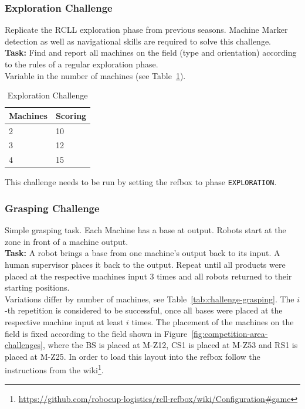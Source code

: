 \documentclass[12pt,twoside]{article}
\newcommand{\reffig}[1]{Figure~\ref{#1}}
\newcommand{\reftab}[1]{Table~\ref{#1}}
\begin{document}
\subsubsection{Exploration Challenge}\label{sec:challenge-exploration}
Replicate the \ac{RCLL} exploration phase from previous seasons.
Machine Marker detection as well as navigational skills are required to solve
this challenge.\\
\textbf{Task:} Find and report all machines on the field (type and orientation)
according to the rules of a regular exploration phase.
\\
Variable in the number of machines
(see \reftab{tab:challenge-exploration}).
\begin{table}[!htb]
 \centering
 \begin{tabular}{l|l}
  Machines & Scoring \\\hline
  2   & 10 \\
  3   & 12 \\
  4   & 15 \\
 \end{tabular}
 \caption{Exploration Challenge}
 \label{tab:challenge-exploration}
\end{table}
This challenge needs to be run by setting the \ac{refbox} to phase
\texttt{EXPLORATION}.

\subsubsection{Grasping Challenge}\label{sec:challenge-grasping}
Simple grasping task.
Each Machine has a base at output.
Robots start at the zone in front of a machine output.\\
\textbf{Task:} A robot brings a base from one machine's output back to its
input. A human supervisor places it back to the output. Repeat until all
products were placed at the respective machines input 3 times and all robots
returned to their starting positions. \\
Variations differ by number of machines, see
\reftab{tab:challenge-grasping}. The $i$-th repetition is considered to be
successful, once all bases were placed at the respective machine input
at least $i$ times.
The placement of the machines on the field is fixed according to the field
shown in \reffig{fig:competition-area-challenges}, where the \ac{BS} is
placed at M-Z12, CS1 is placed at M-Z53 and \ac{RS}1 is placed at M-Z25.
In order to load this layout into the \ac{refbox} follow the instructions
from the
wiki\footnote{\url{https://github.com/robocup-logistics/rcll-refbox/wiki/Configuration\#game}}. %
\end{document}
